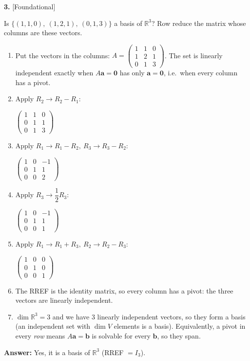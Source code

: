 \documentclass[11pt]{article}
\begin{document}
\par\vspace{2pt}
\begin{minipage}{\linewidth}\textbf{3.} \hfill{\scriptsize\color{ink}[Foundational]}\par\nopagebreak Is $\{(1,1,0),\ (1,2,1),\ (0,1,3)\}$ a basis of $\mathbb{R}^{3}$? Row reduce the matrix whose columns are these vectors.
\end{minipage}\par\nopagebreak
\begin{tcolorbox}[breakable,colback=ans,colframe=ansb,boxrule=0.5pt,left=4pt,right=4pt,top=2pt,bottom=2pt]\begin{enumerate}[leftmargin=3.1em,itemsep=1pt,topsep=1pt,label=\textbf{Step \arabic*.}]\item Put the vectors in the columns: $A=\begin{pmatrix}1 & 1 & 0 \\ 1 & 2 & 1 \\ 0 & 1 & 3\end{pmatrix}$. The set is linearly independent exactly when $A\mathbf a=\mathbf 0$ has only $\mathbf a=\mathbf 0$, i.e.\ when every column has a pivot.
\item Apply $R_2\to R_2-R_1$:\par\smallskip $\displaystyle \begin{pmatrix}1 & 1 & 0 \\ 0 & 1 & 1 \\ 0 & 1 & 3\end{pmatrix}$
\item Apply $R_1\to R_1-R_2,\ R_3\to R_3-R_2$:\par\smallskip $\displaystyle \begin{pmatrix}1 & 0 & -1 \\ 0 & 1 & 1 \\ 0 & 0 & 2\end{pmatrix}$
\item Apply $R_3\to \dfrac{1}{2} R_3$:\par\smallskip $\displaystyle \begin{pmatrix}1 & 0 & -1 \\ 0 & 1 & 1 \\ 0 & 0 & 1\end{pmatrix}$
\item Apply $R_1\to R_1+R_3,\ R_2\to R_2-R_3$:\par\smallskip $\displaystyle \begin{pmatrix}1 & 0 & 0 \\ 0 & 1 & 0 \\ 0 & 0 & 1\end{pmatrix}$
\item The RREF is the identity matrix, so every column has a pivot: the three vectors are linearly independent.
\item $\dim\mathbb{R}^{3}=3$ and we have $3$ linearly independent vectors, so they form a basis (an independent set with $\dim V$ elements is a basis). Equivalently, a pivot in every \emph{row} means $A\mathbf a=\mathbf b$ is solvable for every $\mathbf b$, so they span.
\end{enumerate}\textbf{Answer:} Yes, it is a basis of $\mathbb{R}^{3}$ (RREF $=I_3$).\end{tcolorbox}
\end{document}
